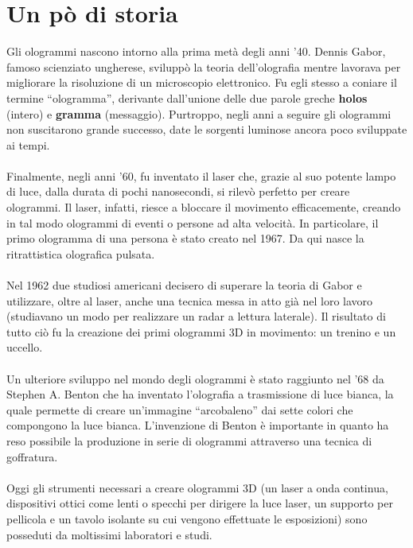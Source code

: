 \section{Un pò di storia}
Gli ologrammi nascono intorno alla prima metà degli anni ’40. Dennis Gabor, famoso scienziato ungherese, sviluppò la teoria dell’olografia mentre lavorava per migliorare la risoluzione di un microscopio elettronico. Fu egli stesso a coniare il termine “ologramma”, derivante dall’unione delle due parole greche \textbf{holos} (intero) e \textbf{gramma} (messaggio). Purtroppo, negli anni a seguire gli ologrammi non suscitarono grande successo, date le sorgenti luminose ancora poco sviluppate ai tempi.
\\
\\
Finalmente, negli anni ’60, fu inventato il laser che, grazie al suo potente lampo di luce, dalla durata di pochi nanosecondi, si rilevò perfetto per creare ologrammi. Il laser, infatti, riesce a bloccare il movimento efficacemente, creando in tal modo ologrammi di eventi o persone ad alta velocità. In particolare, il primo ologramma di una persona è stato creato nel 1967. Da qui nasce la ritrattistica olografica pulsata.
\\
\\
Nel 1962 due studiosi americani decisero di superare la teoria di Gabor e utilizzare, oltre al laser, anche una tecnica messa in atto già nel loro lavoro (studiavano un modo per realizzare un radar a lettura laterale). Il risultato di tutto ciò fu la creazione dei primi ologrammi 3D in movimento: un trenino e un uccello.
\\
\\
Un ulteriore sviluppo nel mondo degli ologrammi è stato raggiunto nel ’68 da Stephen A. Benton che ha inventato l’olografia a trasmissione di luce bianca, la quale permette di creare un’immagine “arcobaleno” dai sette colori che compongono la luce bianca. L’invenzione di Benton è importante in quanto ha reso possibile la produzione in serie di ologrammi attraverso una tecnica di goffratura. 
\\
\\
Oggi gli strumenti necessari a creare ologrammi 3D (un laser a onda continua, dispositivi ottici come lenti o specchi per dirigere la luce laser, un supporto per pellicola e un tavolo isolante su cui vengono effettuate le esposizioni) sono posseduti da moltissimi laboratori e studi.\cite{PMFRESEARCH}

